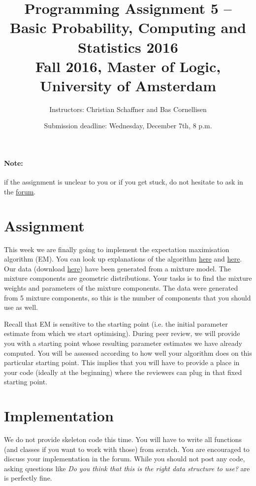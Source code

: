\documentclass[11pt, leqno, a4paper]{article}
\title{Programming Assignment 5 -- Basic Probability, Computing and Statistics 2016 \\[2mm]
\large{Fall 2016, Master of Logic, University of Amsterdam}}
\author{Instructors: Christian Schaffner and Bas Cornellisen}
\date{Submission deadline: Wednesday, December 7th, 8 p.m.}
\begin{document}
\maketitle

\paragraph{Note:} if the assignment is unclear to you or if you get
stuck, do not hesitate to ask in the
\href{https://www.moodle.ch/lms/mod/forum/view.php?id=1721}{forum}.

\section{Assignment}

This week we are finally going to implement the expectation maximisation algorithm (EM). You can look up explanations of the algorithm 
\href{https://github.com/BasicProbability/LectureNotes/blob/master/chapter6/chapter6.pdf}{here} and 
\href{}{here}. Our data (download \href{https://github.com/BasicProbability/BasicProbability.github.io/raw/master/Homework/Programming/2016-17/Assignment5/geometric_data.txt}{here}) have been generated from a mixture model. The mixture components are geometric distributions. Your tasks is to find
the mixture weights and parameters of the mixture components. The data were generated from 5 mixture components, so this is the number of components
that you should use as well.

Recall that EM is sensitive to the starting point (i.e. the initial parameter estimate from which we start optimising). During peer review, we will
provide you with a starting point whose resulting parameter estimates we have already computed. You will be assessed according to how well your
algorithm does on this particular starting point. This implies that you will have to provide a place in your code (ideally at the beginning) where
the reviewers can plug in that fixed starting point.

\section{Implementation}

We do not provide skeleton code this time. You will have to write all functions (and classes if you want to work with those) from scratch. You are encouraged
to discuss your implementation in the forum. While you should not post any code, asking questions like \textit{Do you think that this is the right data structure
to use?} are is perfectly fine. 
\end{document}
